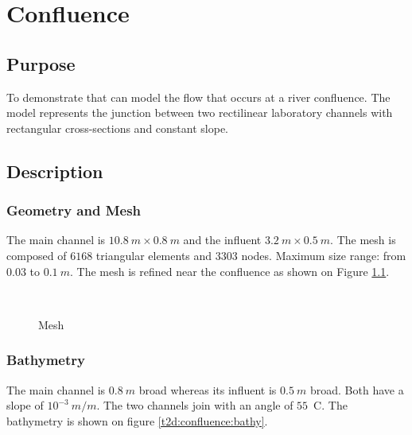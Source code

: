 \chapter{Confluence}
%

%
\section{Purpose}
%
To demonstrate that  can model the flow that occurs at a river
confluence. The model represents the junction between two rectilinear laboratory channels
with rectangular cross-sections and constant slope.

%
\section{Description}

%
%
\subsection{Geometry and Mesh}
%
The main channel is $10.8~m \times 0.8~m$ and the influent $3.2~m \times 0.5~m$.
The mesh is composed of $6168$ triangular elements and $3303$ nodes. 
Maximum size range: from $0.03$ to $0.1~m$.
The mesh is refined near the confluence as shown on Figure \ref{t2d:confluence:mesh}.

%
\begin{figure}[H]
  \centering
  \\
  \caption{Mesh}\label{t2d:confluence:mesh}
\end{figure}

%
%
%

\subsection{Bathymetry}

The main channel is $0.8~m$ broad whereas its influent is $0.5~m$ broad.
Both have a slope of $10^{-3}~m/m$.
The two channels join with an angle of $55$~\degree{}C.
The bathymetry is shown on figure \ref{t2d:confluence:bathy}.


